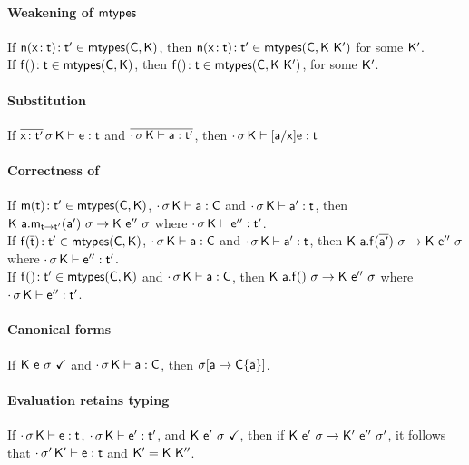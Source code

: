 \documentclass[acmlarge, anonymous, authordraft]{acmart}
\begin{document}
\paragraph{Weakening of ${\sf{mtypes}}$}

If $\Mtype\n{\HT\x\t}\tp \in \classoff{\C}{\K}$, then $\Mtype\n{\HT\x\t}\tp \in \classoff{\C}{\K~\Kp}$ for some ${{\sf{K'}}}$.\\
If $\Mtype\f{}\t \in \classoff\C\K$, then $\Mtype\f{}\t \in \classoff\C{\K~\Kp}$, for some ${{\sf{K'}}}$.

\paragraph{Substitution}

If $\EnvType{\b{\HT\x\tp}}\s\K\e\t$ and $\b{\EnvType\cdot\s\K\a\tp}$, then $\EnvType\cdot\s\K{[\a/\x]\e}\t$

\paragraph{Correctness of \classoff{\C}{\K}}

If $\Mtype\m{\t}\tp \in \classoff{\C}{\K}$, $\cdot\,\sigma\,{\sf{K}}\vdash {\sf{a}} : {\sf{C}}$ and 
$\EnvType\cdot\s\K\ap\t$, then $\Reduce \K{\KCall\a\m{\ap}{\t}{\tp}}\s \K\epp\s$ where $\EnvType\cdot\s\K\epp\tp$. \\
If $\Mtype\f{\b\t}\tp \in \classoff{\C}{\K}$, $\cdot\,\sigma\,{\sf{K}}\vdash {\sf{a}} : {\sf{C}}$ and 
$\EnvType\cdot\s\K\ap\t$, then ${{\sf{K}}}~{{\sf{a}}.{\sf{f}}(\overline{{\sf{a}}'})}~{\sigma} \rightarrow {\ensuremath{{\sf{K}}}}~{{{{\sf{e''}}}}}~{\sigma}$ where $\EnvType\cdot\s\K\epp\tp$. \\
If $\Mtype\f{}\tp \in \classoff{\C}{\K}$ and $\cdot\,\sigma\,{\sf{K}}\vdash {\sf{a}} : {\sf{C}}$, 
then ${{\sf{K}}}~{{\sf{a}}.{\sf{f}}()}~{\sigma} \rightarrow {\ensuremath{{\sf{K}}}}~{{{{\sf{e''}}}}}~{\sigma}$ where $\EnvType\cdot\s\K\epp\tp$.

\paragraph{Canonical forms}

If ${\sf{K}}~{\sf{e}}~\sigma~\checkmark$ and $\cdot\,\sigma\,{\sf{K}}\vdash {\sf{a}} : {\sf{C}}$, then $\sigma[{\sf{a}}\mapsto{ \ensuremath{ {\sf{C}}\{\overline{{\sf{a}}}\}}}]$.

\paragraph{Evaluation retains typing} \label{lem:ert}

If $\EnvType\cdot\s\K\e\t$, $\EnvType\cdot\s\K\ep\tp$, and ${\sf{K}}~{{{\sf{e'}}}}~\sigma~\checkmark$, then if ${{\sf{K}}}~{{{{\sf{e'}}}}}~{\sigma} \rightarrow {{\ensuremath{{\sf{K'}}}}}~{{{{\sf{e''}}}}}~{{{\sigma'}}}$, it follows that $\EnvType\cdot\sp\Kp\e\t$ and ${{\sf{K'}}} = {\sf{K}}~{{\sf{K''}}}$.
\end{document}
